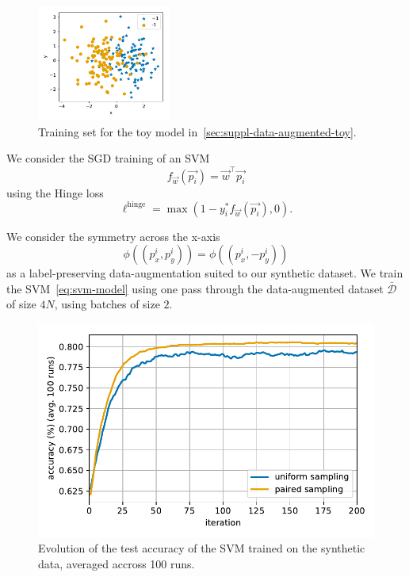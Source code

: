 \begin{figure}
\centering
\includegraphics[height=1.5in]{figs/toy/toy_data}
\caption{\label{fig:toy-train}
	Training set for the toy model in~\cref{sec:suppl-data-augmented-toy}.
}
\end{figure}

We consider the SGD training of an SVM
\begin{equation}\label{eq:svm-model}
    f_{\vec{w}}(\vec{p_i}) = \vec{w}^{\top} \vec{p_i}
\end{equation}
using the Hinge loss
\begin{equation}
    \ell^{\text{hinge}} = \max{(1 - y_i^* f_{\vec{w}}(\vec{p_i}), 0)}.
\end{equation}

We consider the symmetry across the x-axis
\begin{equation}
    \phi((p^i_x, p^i_y)) = \phi((p^i_x, -p^i_y))
\end{equation}
as a label-preserving data-augmentation suited to our synthetic dataset. 
We train the SVM~\eqref{eq:svm-model} using one pass through the data-augmented dataset $\bar{\mathcal{D}}$ of size $4N$, using batches of size $2$.

\begin{figure}
\includegraphics[width=\linewidth]{figs/toy/conv_toy_plot}
\caption{\label{fig:evo-toy}
	Evolution of the test accuracy of the SVM trained on the synthetic data, averaged accross 100 runs.
}
\end{figure}

